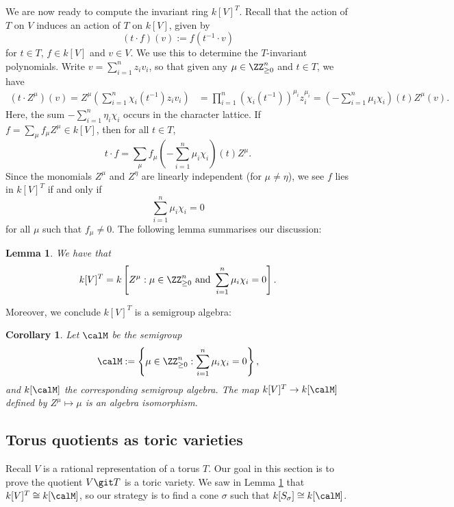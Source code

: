\documentclass[12pt]{amsart}
\theoremstyle{plain}
\newtheorem{corollary}[theorem]{Corollary}
\newtheorem{lemma}[theorem]{Lemma}
\theoremstyle{definition}
\begin{document}
We are now ready to compute the invariant ring $k[V]^T$.
Recall that the action of $T$ on $V$ induces an action of $T$ on $k[V]$, given by
$$(t \cdot f)(v) := f(t^{-1} \cdot v)$$
for $t \in T$, $f \in k[V]$ and $v \in V$.
We use this to determine the $T$-invariant polynomials.
Write $v =\sum_{i=1}^n z_i v_i$, so that given any $\mu \in \ZZ_{\ge 0}^n$ and $t \in T$, we have
\begin{align*}
	(t \cdot Z^\mu)(v) = Z^\mu \left( \sum_{i=1}^n \chi_i(t^{-1}) z_i v_i\right) 
	&= \prod_{i=1}^n \left(\chi_i(t^{-1})\right)^{\mu_i} z_i^{\mu_i} %
	= \left(-\sum_{i=1}^n \mu_i \chi_i \right)(t) Z^\mu(v).
\end{align*}
Here, the sum $-\sum_{i=1}^n \eta_i \chi_i$ occurs in the character lattice.
If $f = \sum_{\mu} f_\mu Z^\mu \in k[V]$, then for all $t \in T$,
$$t \cdot f = \sum_\mu f_\mu \left(-\sum_{i=1}^n \mu_i \chi_i \right)(t) Z^\mu.$$
Since the monomials $Z^\mu$ and $Z^\eta$ are linearly independent (for $\mu \ne \eta$), we see $f$ lies in $k[V]^T$ if and only if
$$\sum_{i=1}^n \mu_i \chi_i = 0$$
for all $\mu$ such that $f_\mu \ne 0$.
The following lemma summarises our discussion:

\begin{lemma}\label{lemma:invariantring}
We have that
$$k[V]^T = k \left[Z^\mu : \mu \in \ZZ_{\ge 0}^n \text{ and } \sum_{i=1}^n \mu_i \chi_i = 0 \right].$$
\end{lemma}

Moreover, we conclude $k[V]^T$ is a semigroup algebra:

\begin{corollary}\label{lemma:invariantringcorollary}
Let $\calM$ be the semigroup
$$\calM := \left\{\mu \in \ZZ_{\ge 0}^n : \sum_{i=1}^n \mu_i \chi_i = 0 \right\},$$
and $k[\calM]$ the corresponding semigroup algebra.
The map $k[V]^T \to k[\calM]$ defined by $Z^\mu \mapsto \mu$ is an algebra isomorphism.
\end{corollary}






\subsection{Torus quotients as toric varieties}\label{section:torusquotientsastoricvarieties}
Recall $V$ is a rational representation of a torus $T$.
Our goal in this section is to prove the quotient $V \git T$ is a toric variety.
We saw in Lemma \ref{lemma:invariantringcorollary} that $k[V]^T \cong k[\calM]$, so our strategy is to find a cone $\sigma$ such that $k[S_\sigma] \cong k[\calM]$.
\end{document}
